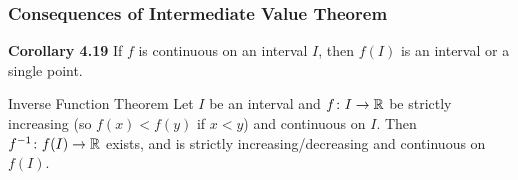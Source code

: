 \documentclass[class=article, crop=false]{standalone}
\begin{document}
  \subsubsection{Consequences of Intermediate Value Theorem}
  \textbf{Corollary 4.19} If $f$ is continuous on an interval $I$, then $f(I)$ is an interval or a single point. \par
  \begin{theorem}{Inverse Function Theorem}
    Let $I$ be an interval and $f\colon I\to \mathbb{R}$ be strictly increasing (so $f(x) < f(y)$ if $x < y$) and continuous on $I$. Then $f^{-1}\colon f(I)\to \mathbb{R}$ exists, and is strictly increasing/decreasing and continuous on $f(I)$.
  \end{theorem}
\end{document}
